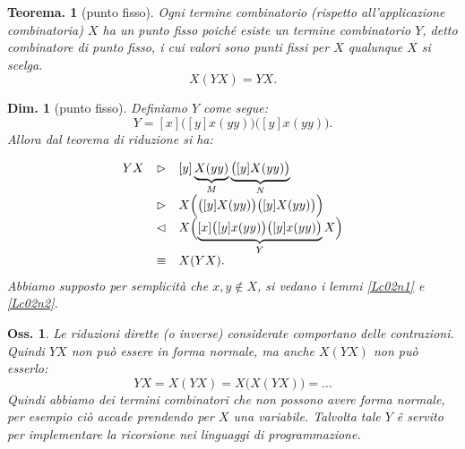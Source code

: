 \documentclass{book}
\newtheorem{osservazione}{Oss.}[chapter]
\newtheorem{teorema}{Teorema.}[chapter]
\newtheorem{dimostrazione}{Dim.}[chapter]
\begin{document}
\begin{teorema}[punto fisso]
Ogni termine combinatorio (rispetto all'applicazione combinatoria) $X$ ha un
punto fisso poich\'e esiste un termine combinatorio $Y$, detto \emph{
combinatore di punto fisso}, i cui valori sono punti fissi per $X$ qualunque
$X$ si scelga.
\[
X(YX) = YX.
\]
\end{teorema}

\begin{dimostrazione}[punto fisso]
Definiamo $Y$ come segue:
\[ Y = [x]\bigl([y]x(yy)\bigr)\bigl([y]x(yy)\bigr). \]
Allora dal teorema di riduzione si ha:

\[
\begin{array}{lcl}
YX & \vartriangleright & [y]\underbrace{X(yy)}_{M}\underbrace{\bigl([y]X(yy)
\bigr)}_{N} \\
& \vartriangleright & X\Bigl(\bigl([y]X(yy)\bigr)\bigl([y]X(yy)\bigr)\Bigr)\\
& \vartriangleleft & X\Bigl(\underbrace{[x]\bigl([y]x(yy)\bigr)\bigl([y]x
(yy)\bigr)}_{Y}X\Bigr) \\
& \equiv & X(YX). \\
\end{array}
\]
Abbiamo supposto per semplicit\`a che $x, y \notin X$, si vedano i lemmi 
\ref{Lc02n1} e \ref{Lc02n2}.
\end{dimostrazione}

\begin{osservazione}
Le riduzioni dirette (o inverse) considerate comportano delle contrazioni.
Quindi $YX$ non pu\`o essere in forma normale, ma anche $X(YX)$ non pu\`o
esserlo:
\[ YX = X(YX) = X\bigl(X(YX)\bigr) = \ldots \]
Quindi abbiamo dei termini combinatori che non possono avere forma normale, 
per esempio ci\`o accade prendendo per $X$ una variabile.
Talvolta tale $Y$ \~e servito per implementare la ricorsione nei linguaggi di
programmazione.
\end{osservazione}
\end{document}

